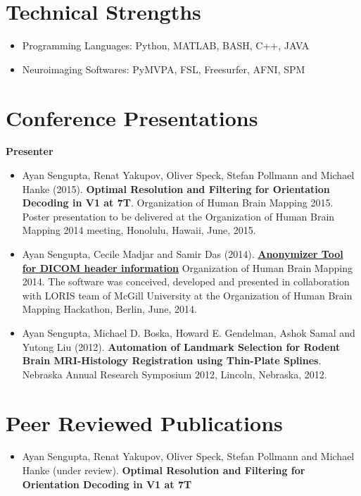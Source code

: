 \documentclass[line, margin]{res}
\begin{document}
\begin{resume}
\section{Technical Strengths}
\begin{itemize}
    \item Programming Languages: Python, MATLAB, BASH, C++, JAVA
    \item Neuroimaging Softwares: PyMVPA, FSL, Freesurfer, AFNI, SPM
\end{itemize}


\section{Conference Presentations}
\textbf{Presenter}
\begin{itemize}
    \item Ayan Sengupta, Renat Yakupov, Oliver Speck, Stefan Pollmann and Michael Hanke (2015). \textbf{Optimal Resolution and Filtering for Orientation Decoding in V1 at 7T}. Organization of Human Brain Mapping 2015.  Poster presentation to be delivered at the Organization of Human Brain Mapping 2014 meeting, Honolulu, Hawaii, June, 2015. 

    \item Ayan Sengupta, Cecile Madjar and Samir Das (2014). \href{https://github.com/aces/DICOM_anonymizer/blob/master/README.md}{\textbf{Anonymizer Tool for DICOM header information}} Organization of Human Brain Mapping 2014. The software was conceived, developed and presented in collaboration with LORIS team of McGill University at the Organization of Human Brain Mapping Hackathon, Berlin, June, 2014.

    \item Ayan Sengupta, Michael D. Boska, Howard E. Gendelman, Ashok Samal and Yutong Liu (2012). \textbf{Automation of Landmark Selection for Rodent Brain MRI-Histology Registration using Thin-Plate Splines}. Nebraska Annual Research Symposium 2012, Lincoln, Nebraska, 2012. 

 
\end{itemize}




\section{Peer Reviewed Publications}
\begin{itemize}
    \item Ayan Sengupta, Renat Yakupov, Oliver Speck, Stefan Pollmann and Michael Hanke (under review). \textbf{Optimal Resolution and Filtering for Orientation Decoding in V1 at 7T}
  

\end{itemize}
\end{resume}
\end{document}

